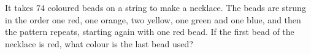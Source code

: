 It takes $74$ coloured beads on a string to make a necklace. The beads are strung in the order one red, one orange, two yellow, one green and one blue, and then the pattern repeats, starting again with one red bead. If the first bead of the necklace is red, what colour is the last bead used?

